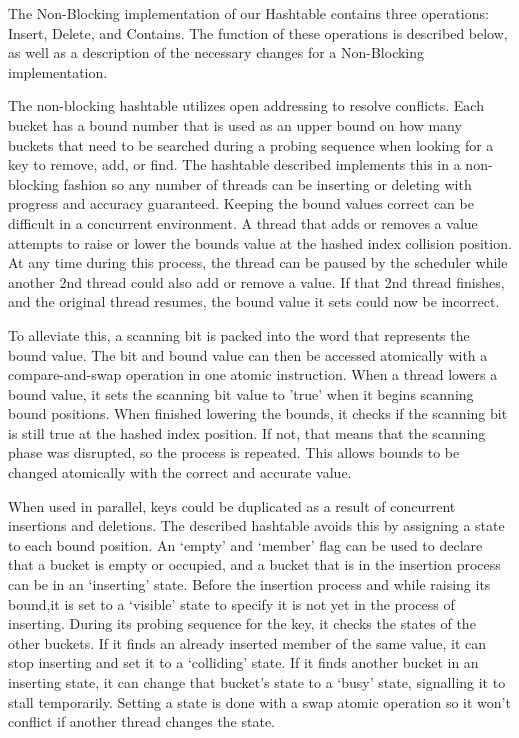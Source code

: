 \documentclass[journal]{IEEEtran}
\begin{document}
The Non-Blocking implementation of our Hashtable contains three operations: Insert, Delete, and Contains. The function of these operations is described below, as well as a description of the necessary changes for a Non-Blocking implementation.

	The non-blocking hashtable utilizes open addressing to resolve conflicts. Each bucket has a bound number that is used as an upper bound on how many buckets that need to be searched during a probing sequence when looking for a key to remove, add, or find. The hashtable described implements this in a non-blocking fashion so any number of threads can be inserting or deleting with progress and accuracy guaranteed.
Keeping the bound values correct can be difficult in a concurrent environment. A thread that adds or removes a value attempts to raise or lower the bounds value at the hashed index collision position. At any time during this process, the thread can be paused by the scheduler while another 2nd thread could also add or remove a value. If that 2nd thread finishes, and the original thread resumes, the bound value it sets could now be incorrect. 

	To alleviate this, a scanning bit is packed into the word that represents the bound value. The bit and bound value can then be accessed atomically with a compare-and-swap operation in one atomic instruction. When a thread lowers a bound value, it sets the scanning bit value to 'true' when it begins scanning bound positions. When finished lowering the bounds, it checks if the scanning bit is still true at the hashed index position. If not, that means that the scanning phase was disrupted, so the process is repeated. This allows bounds to be changed atomically with the correct and accurate value.
	
	When used in parallel, keys could be duplicated as a result of concurrent insertions and deletions. The described hashtable avoids this by assigning a state to each bound position. An ‘empty’ and ‘member’ flag can be used to declare that a bucket is empty or occupied, and a bucket that is in the insertion process can be in an ‘inserting’ state. Before the insertion process and while raising its bound,it is set to a ‘visible’ state to specify it is not yet in the process of inserting. During its probing sequence for the key, it checks the states of the other buckets. If it finds an already inserted member of the same value, it can stop inserting and set it to a ‘colliding’ state. If it finds another bucket in an inserting state, it can change that bucket's state to a ‘busy’ state, signalling it to stall temporarily. Setting a state is done with a swap atomic operation so it won't conflict if another thread changes the state.
	
\end{document}
